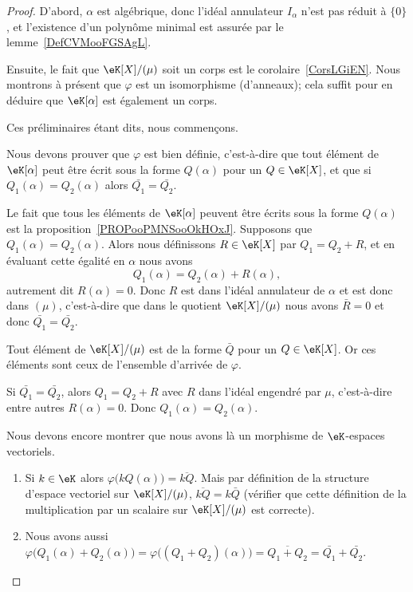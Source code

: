 \begin{proof}
	D'abord, \( \alpha\) est algébrique, donc l'idéal annulateur \( I_{\alpha}\) n'est pas réduit à \( \{ 0 \}\), et l'existence d'un polynôme minimal est assurée par le lemme~\ref{DefCVMooFGSAgL}.

	Ensuite, le fait que \( \eK[X]/(\mu)\) soit un corps est le corolaire~\ref{CorsLGiEN}. Nous montrons à présent que \( \varphi\) est un isomorphisme (d'anneaux); cela suffit pour en déduire que \( \eK[\alpha]\) est également un corps.

	Ces préliminaires étant dits, nous commençons.
	\begin{subproof}
		Nous devons prouver que \( \varphi\) est bien définie, c'est-à-dire que tout élément de \( \eK[\alpha]\) peut être écrit sous la forme \( Q(\alpha)\) pour un \( Q\in \eK[X]\), et que si \( Q_1(\alpha)=Q_2(\alpha)\) alors \( \bar{Q_1}=\bar{Q_2} \).

		Le fait que tous les éléments de \( \eK[\alpha]\) peuvent être écrits sous la forme \( Q(\alpha)\) est la proposition~\ref{PROPooPMNSooOkHOxJ}. Supposons que \( Q_1(\alpha)=Q_2(\alpha)\). Alors nous définissons \( R\in \eK[X]\) par \( Q_1=Q_2+R\), et en évaluant cette égalité en \( \alpha\) nous avons
		\begin{equation}
			Q_1(\alpha)=Q_2(\alpha)+R(\alpha),
		\end{equation}
		autrement dit \( R(\alpha)=0\). Donc \( R\) est dans l'idéal annulateur de \( \alpha\) et est donc dans \( (\mu)\), c'est-à-dire que dans le quotient \( \eK[X]/(\mu)\) nous avons \( \bar R=0\) et donc \( \bar{Q_1}=\bar{Q_2} \).

		\spitem[Surjective]

		Tout élément de \( \eK[X]/(\mu)\) est de la forme \( \bar Q\) pour un \( Q\in \eK[X]\). Or ces éléments sont ceux de l'ensemble d'arrivée de \( \varphi\).

		\spitem[Injective]

		Si \( \bar{Q_1}=\bar{Q_2} \), alors \( Q_1=Q_2+R\) avec \( R\) dans l'idéal engendré par \( \mu\), c'est-à-dire entre autres \( R(\alpha)=0\). Donc \( Q_1(\alpha)=Q_2(\alpha)\).

	\end{subproof}

	Nous devons encore montrer que nous avons là un morphisme de \( \eK\)-espaces vectoriels.
	\begin{enumerate}
		\item
		      Si \( k\in \eK\) alors \( \varphi\big( kQ(\alpha) \big)=\overline{ kQ }\). Mais par définition de la structure d'espace vectoriel sur \( \eK[X]/(\mu)\), \( \overline{ kQ }=k\bar Q\) (vérifier que cette définition de la multiplication par un scalaire sur \( \eK[X]/(\mu)\) est correcte).
		\item
		      Nous avons aussi \( \varphi\big( Q_1(\alpha)+Q_2(\alpha) \big)=\varphi\big( (Q_1+Q_2)(\alpha) \big)=\overline{ Q_1+Q_2 }=\bar{Q_1} +\bar{Q_2} \).
	\end{enumerate}
\end{proof}


